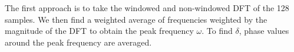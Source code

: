 \documentclass[11pt]{article}
\begin{document}
	

	
		
    The first approach is to take the windowed and non-windowed DFT of the
128 samples. We then find a weighted average of frequencies weighted by
the magnitude of the DFT to obtain the peak frequency \(\omega\). To
find \(\delta\), phase values around the peak frequency are averaged.

	

	
		
	
	
		
	
		
			
		
	
		
			
		
	
		
			
		
	
		
			
		
	
		
			
		
	
		
			
		
	
		
			
		
	
		
			
		
	
		
			
		
	
		
			
		
	
		
			
		
	
		
			
		
	
		
			
		
	
		
			
		
	
		
			
		
	
		
			
		
	
		
			
		
	
		
			
		
	
		
			
		
	
		
			
		
	
		
			
		
	
		
			
		
	
\end{document}
